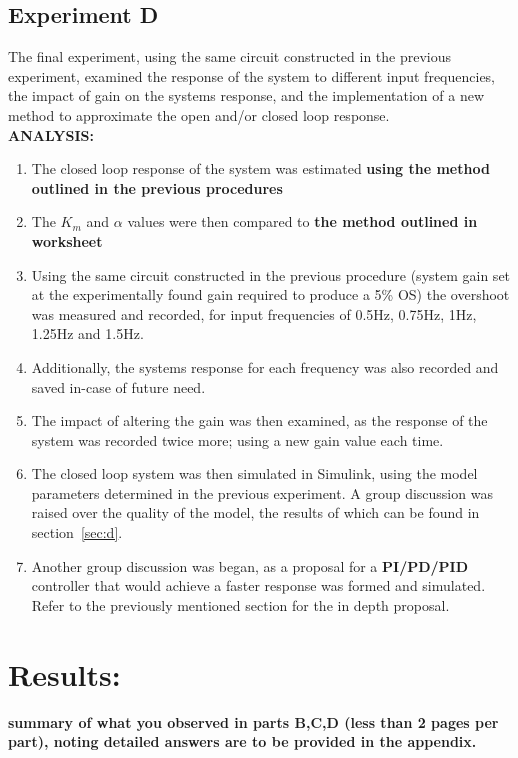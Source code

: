 \documentclass[11pt,a4paper]{article}
\begin{document}
\pagebreak
\subsection{Experiment D}
The final experiment, using the same circuit constructed in the previous experiment, examined the response of the system to different input frequencies, the impact of gain on the systems response, and the implementation of a new method to approximate the open and/or closed loop response. \\

\textbf{ANALYSIS:}
\begin{enumerate}
	\item The closed loop response of the system was estimated \textbf{using the method outlined in the previous procedures}
	\item The $K_m$ and $\alpha$ values were then compared to \textbf{the method outlined in worksheet}
	\item Using the same circuit constructed in the previous procedure (system gain set at the experimentally found gain required to produce a 5\% OS) the overshoot was measured and recorded, for input frequencies of 0.5Hz, 0.75Hz, 1Hz, 1.25Hz and 1.5Hz. 
	\item Additionally, the systems response for each frequency was also recorded and saved in-case of future need.
	\item The impact of altering the gain was then examined, as the response of the system was recorded twice more; using a new gain value each time.
	\item The closed loop system was then simulated in Simulink, using the model parameters determined in the previous experiment. A group discussion was raised over the quality of the model, the results of which can be found in section~\ref{sec:d}.
	\item Another group discussion was began, as a proposal for a \textbf{PI/PD/PID} controller that would achieve a faster response was formed and simulated. Refer to the previously mentioned section for the in depth proposal.
\end{enumerate}








\pagebreak
\section{Results:}
\textbf{summary of what you observed in parts B,C,D (less than 2 pages per part), noting detailed answers are to be provided in the appendix.}
\end{document}
